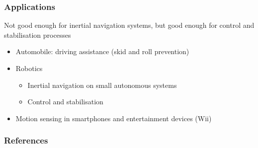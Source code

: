 \documentclass[10pt]{beamer}
\begin{document}
\begin{frame}
\frametitle{Applications}
    Not good enough for inertial navigation systems, but good enough for control and stabilisation processes
    \begin{itemize}
        \item Automobile: driving assistance (skid and roll prevention)
        \item Robotics
        \begin{itemize}
            \item Inertial navigation on small autonomous systems
            \item Control and stabilisation
        \end{itemize}
        \item Motion sensing in smartphones and entertainment devices (Wii)
    \end{itemize}
\end{frame}


\begin{frame}[allowframebreaks]
\frametitle{References}
    
    
\end{frame}

\end{document}
